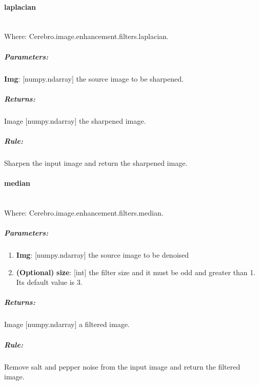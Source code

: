 \paragraph{laplacian} \mbox{} \\
Where: Cerebro.image.enhancement.filters.laplacian.
\subparagraph{Parameters:}
\begin{changemargin}{1cm}{0cm}
	\textbf{Img}: [numpy.ndarray] the source image to be sharpened.
\end{changemargin}

\subparagraph{Returns:}
\begin{changemargin}{1cm}{0cm}
	Image [numpy.ndarray] the sharpened image.
\end{changemargin}

\subparagraph{Rule:}
\begin{changemargin}{1cm}{0cm}
	Sharpen the input image and return the sharpened image.
\end{changemargin}


\paragraph{median} \mbox{} \\
Where: Cerebro.image.enhancement.filters.median.
\subparagraph{Parameters:}
\begin{changemargin}{0.5cm}{0cm}
	\begin{enumerate}
		\item \textbf{Img}: [numpy.ndarray] the source image to be denoised
		\item \textbf{(Optional)} \textbf{size}: [int] the filter size and it must be odd and greater than 1. Its default value is 3.
	\end{enumerate}
\end{changemargin}

\subparagraph{Returns:}
\begin{changemargin}{1cm}{0cm}
	Image [numpy.ndarray] a filtered image.
\end{changemargin}

\subparagraph{Rule:}
\begin{changemargin}{1cm}{0cm}
 	Remove salt and pepper noise from the input image and return the filtered image.
\end{changemargin}

 	

